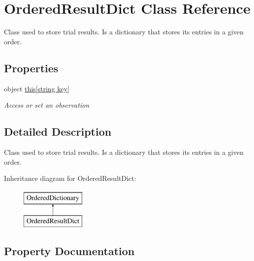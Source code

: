 \hypertarget{class_ordered_result_dict}{}\section{Ordered\+Result\+Dict Class Reference}
\label{class_ordered_result_dict}


Class used to store trial results. Is a dictionary that stores its entries in a given order.  


\subsection*{Properties}
\begin{DoxyCompactItemize}
\item 
object \hyperlink{class_ordered_result_dict_ab4cd8757429b6482f1ca786b77384f33}{this\mbox{[}string key\mbox{]}}
\begin{DoxyCompactList}\small\item\em Access or set an observation \end{DoxyCompactList}\end{DoxyCompactItemize}


\subsection{Detailed Description}
Class used to store trial results. Is a dictionary that stores its entries in a given order. 

Inheritance diagram for Ordered\+Result\+Dict\+:\begin{figure}[H]
\begin{center}
\leavevmode
\includegraphics[height=2.000000cm]{class_ordered_result_dict}
\end{center}
\end{figure}


\subsection{Property Documentation}
\mbox{\label{class_ordered_result_dict_ab4cd8757429b6482f1ca786b77384f33}} 
